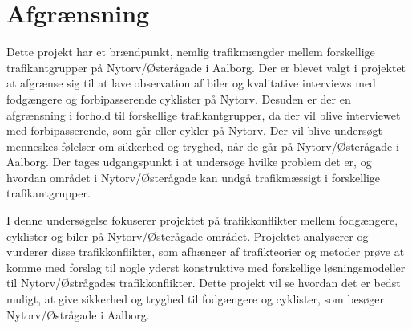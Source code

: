 \chapter{Afgrænsning}
\label{chap:Afgrænsning}




Dette projekt har et brændpunkt, nemlig trafikmængder mellem forskellige trafikantgrupper på Nytorv/Østerågade i Aalborg. Der er blevet valgt i projektet at afgrænse sig til at lave observation af biler og kvalitative interviews med fodgængere og forbipasserende cyklister på Nytorv. Desuden er der en afgrænsning i forhold til forskellige trafikantgrupper, da der vil blive interviewet med forbipasserende, som går eller cykler på Nytorv. Der vil blive undersøgt menneskes følelser om sikkerhed og tryghed, når de går på Nytorv/Østerågade i Aalborg. Der tages udgangspunkt i at undersøge hvilke problem det er, og hvordan området i Nytorv/Østerågade kan undgå trafikmæssigt i forskellige trafikantgrupper.



I denne undersøgelse fokuserer projektet på trafikkonflikter mellem fodgængere, cyklister og biler på Nytorv/Østerågade området. Projektet analyserer og vurderer disse trafikkonflikter, som afhænger af trafikteorier og metoder prøve at komme med forslag til nogle yderst konstruktive med forskellige løsningsmodeller til Nytorv/Østrågades trafikkonflikter.  Dette projekt vil se hvordan det er bedst muligt, at give sikkerhed og tryghed til fodgængere og cyklister, som besøger Nytorv/Østrågade i Aalborg.